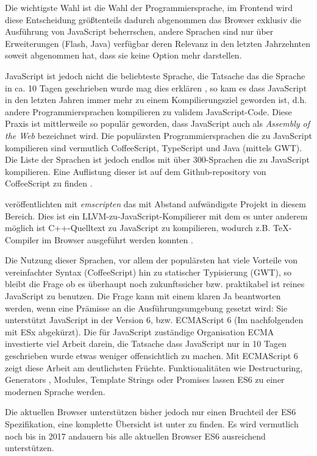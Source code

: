 \documentclass[12pt,twoside]{book}
\begin{document}
Die wichtigste Wahl ist die Wahl der Programmiersprache, im Frontend wird diese Entscheidung größtenteils dadurch abgenommen das Browser exklusiv die Ausführung von JavaScript beherrschen, andere Sprachen sind nur über Erweiterungen (Flash, Java) verfügbar deren Relevanz in den letzten Jahrzehnten soweit abgenommen hat, dass sie keine Option mehr darstellen.

JavaScript ist jedoch nicht die beliebteste Sprache, die Tatsache das die Sprache in ca. 10 Tagen geschrieben wurde mag dies erklären \citep{severance2012javascript}, so kam es dass JavaScript in den letzten Jahren immer mehr zu einem Kompilierungsziel geworden ist, d.h. andere Programmiersprachen kompilieren zu validem JavaScript-Code. Diese Praxis ist mittlerweile so populär geworden, dass JavaScript auch als \textit{Assembly of the Web} \cite{webassembly} bezeichnet wird. Die populärsten Programmiersprachen die zu JavaScript kompilieren sind vermutlich CoffeeScript, TypeScript und Java (mittels GWT). Die Liste der Sprachen ist jedoch endlos mit über 300-Sprachen die zu JavaScript kompilieren. Eine Auflistung dieser ist auf dem Github-repository von CoffeeScript zu finden \cite{javascriptcompile}.

\citep{zakai2011emscripten} veröffentlichten mit \textit{emscripten} das mit Abstand aufwändigste Projekt in diesem Bereich. Dies ist ein LLVM-zu-JavaScript-Kompilierer mit dem es unter anderem möglich ist C++-Quelltext zu JavaScript zu kompilieren, wodurch z.B. TeX-Compiler im Browser ausgeführt werden konnten \cite{texlive}.

Die Nutzung dieser Sprachen, vor allem der populärsten hat viele Vorteile von vereinfachter Syntax (CoffeeScript) hin zu statischer Typisierung (GWT), so bleibt die Frage ob es überhaupt noch zukunftssicher bzw. praktikabel ist reines JavaScript zu benutzen.
Die Frage kann mit einem klaren Ja beantworten werden, wenn eine Prämisse an die Ausführungsumgebung gesetzt wird: Sie unterstützt JavaScript in der Version 6, bzw. ECMAScript 6 (Im nachfolgenden mit ESx abgekürzt).
Die für JavaScript zuständige Organisation ECMA investierte viel Arbeit darein, die Tatsache dass JavaScript nur in 10 Tagen geschrieben wurde etwas weniger offensichtlich zu machen. Mit ECMAScript 6 \cite{es6} zeigt diese Arbeit am deutlichsten Früchte. Funktionalitäten wie Destructuring, Generators , Modules, Template Strings oder Promises lassen ES6 zu einer modernen Sprache werden.

Die aktuellen Browser unterstützen bisher jedoch nur einen Bruchteil der ES6 Spezifikation, eine komplette Übersicht ist unter \cite{es6features} zu finden. Es wird vermutlich noch bis in 2017 andauern bis alle aktuellen Browser ES6 ausreichend unterstützen.
\end{document}
